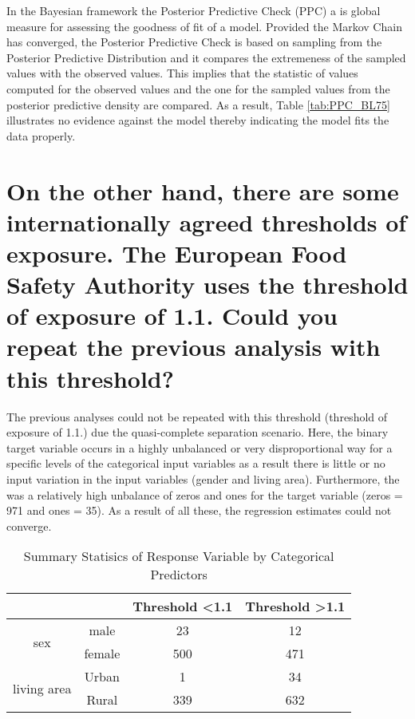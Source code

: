 \documentclass[11pt]{article}
\begin{document}
 In the Bayesian framework the Posterior Predictive Check (PPC) a is global measure for assessing the goodness of fit of a model. Provided the Markov Chain has converged, the Posterior Predictive Check is based on sampling from the  Posterior Predictive Distribution and it compares the extremeness of the sampled values with the observed values. This implies that the statistic of values computed for the observed values and the one for the sampled values from the posterior predictive density are compared. As a result, Table \ref{tab:PPC_BL75} illustrates no evidence against the model thereby indicating the model fits the data properly. \\

\section{On the other hand, there are some internationally agreed thresholds of exposure. The European Food Safety Authority uses the threshold of exposure of 1.1. Could you repeat the previous analysis with this threshold?}
The previous analyses could not be repeated with this threshold (threshold of exposure of 1.1.) due the quasi-complete separation scenario. Here, the binary target variable occurs in a highly unbalanced or very disproportional way for a specific levels of the categorical input variables  as a result there is little or no input variation in the input variables (gender and living area). Furthermore, the was a relatively high unbalance of zeros and ones for the target variable (zeros = 971 and ones = 35). As a result of all these, the regression estimates could not converge.
\begin{table}[H]
\centering
\caption{Summary Statisics of Response Variable by Categorical Predictors}
\label{tab:my-table}
\begin{tabular}{@{}cccc@{}}
\toprule
 &  & \textbf{Threshold \textless 1.1} & \textbf{Threshold \textgreater 1.1} \\ \midrule
\multirow{2}{*}{sex} & male & 23 & 12 \\
 & female & 500 & 471 \\ \midrule
\multirow{2}{*}{living area} & Urban & 1 & 34 \\
 & Rural & 339 & 632 \\ \bottomrule
\end{tabular}
\end{table}
\end{document}
